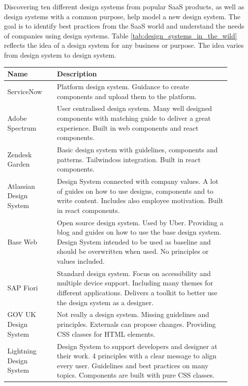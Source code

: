 Discovering ten different design systems from popular SaaS products, as well as design systems with a common purpose, help model a new design system. The goal is to identify best practices from the SaaS world and understand the needs of companies using design systems. Table \ref{tab:design_systems_in_the_wild} reflects the idea of a design system for any business or purpose. The idea varies from design system to design system. \\
\begin{table}[!ht]
\begin{tabular}{|p{0.2\linewidth} | p{0.7\linewidth}|}
\hline
 \textbf{Name} & \textbf{Description} \\ \hline
ServiceNow \cite{servicenow_servicenow_nodate}  & Platform design system.  Guidance to create components and upload them to the platform. \\ \hline
Adobe Spectrum  \cite{spectrum_adobe_spectrum_nodate} & User centralised design system. Many well designed components with matching guide to deliver a great experience. Built in web components and react components. \\ \hline
Zendesk Garden \cite{zendesk_garden_zendesk_nodate} & Basic design system with guidelines, components and patterns. Tailwindcss integration. Built in react components. \\ \hline
Atlassian Design System \cite{atlassian_design_system_atlassian_nodate} & Design System connected with company values. A lot of guides on how to use designs, components and to write content. Includes also employee motivation. Built in react components. \\ \hline
Base Web  \cite{base_base_nodate} & Open source design system. Used by Uber. Providing a blog and guides on how to use the base design system. Design System intended to be used as baseline and should be overwritten when used. No principles or values included. \\ \hline
SAP Fiori  \cite{sap_fiori_nodate} & Standard design system. Focus on accessibility and multiple device support. Including many themes for different applications. Delivers a toolkit to better use the design system as a designer.  \\ \hline
GOV UK Design System  \cite{govuk_govuk_nodate} & Not really a design system. Missing guidelines and principles. Externals can propose changes. Providing CSS classes for HTML elements.  \\ \hline
Lightning Design System \cite{lightning_design_system_lightning_nodate} & Design System to support developers and designer at their work. 4 principles with a clear message to align every user. Guidelines and best practices on many topics.  Components are built with pure CSS classes. \\ \hline

\end{tabular}
\end{table}

